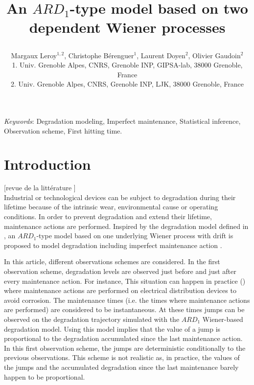 
\usepackage{geometry}
\geometry{hmargin=1.2cm,vmargin=1.5cm}




\title{An $ARD_1$-type model based on two dependent Wiener processes
\author{Margaux {\sc Leroy}$^{1,2}$, Christophe {\sc B\'erenguer}$^{1}$, Laurent {\sc Doyen}$^{2}$, Olivier {\sc Gaudoin}$^{2}$\\
1. Univ. Grenoble Alpes, CNRS, Grenoble INP, GIPSA-lab, 38000 Grenoble, France\\
2. Univ. Grenoble Alpes, CNRS, Grenoble INP, LJK, 38000 Grenoble, France
}}

\maketitle

\begin{abstract}

\end{abstract}

{\it Keywords}: Degradation modeling, Imperfect maintenance, Statistical inference, Observation scheme, First hitting time.


\section{Introduction}

[revue de la littérature ]\\
Industrial or technological devices can be subject to degradation during their lifetime because of the intrinsic wear, environmental cause or operating conditions. In order to prevent degradation and extend their lifetime, maintenance actions are performed.  
Inspired by the degradation model defined in \cite{mercier_stochastic_2019}, an $ARD_1$-type model based on one underlying Wiener process with drift is proposed to model degradation including imperfect maintenance action \cite{leroy_statistical_2022}.

In this article, different observations schemes are considered. In the first observation scheme,  degradation levels are observed just before and just after every maintenance action. For instance, This situation can happen  in practice (\cite{zhao_accelerated_2021}) where maintenance actions are performed on  electrical distribution devices to avoid corrosion. The maintenance times (i.e. the times where maintenance actions are performed) are considered to be instantaneous. At these times jumps can be observed on the degradation trajectory simulated with the $ARD_1$ Wiener-based degradation model. Using this model implies that the value of a jump is proportional to the degradation accumulated since the last maintenance action. In this first observation scheme, the jumps are deterministic conditionally to the previous observations. This scheme is not realistic as, in practice, the values of the jumps and the accumulated degradation since the last maintenance barely happen to be  proportional. 

